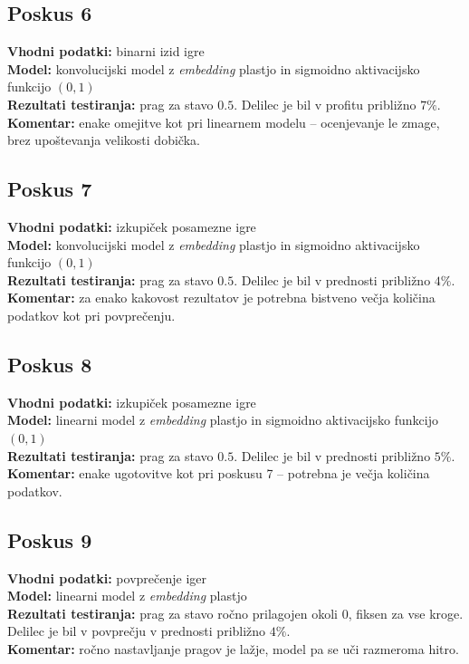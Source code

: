 \documentclass[a4paper,12pt]{article}
\begin{document}
\subsection{Poskus 6}
\textbf{Vhodni podatki:} binarni izid igre \\
\textbf{Model:} konvolucijski model z \textit{embedding} plastjo in sigmoidno aktivacijsko funkcijo $(0,1)$ \\
\textbf{Rezultati testiranja:} prag za stavo $0.5$. Delilec je bil v profitu približno $7\%$. \\
\textbf{Komentar:} enake omejitve kot pri linearnem modelu – ocenjevanje le zmage, brez upoštevanja velikosti dobička.

\subsection{Poskus 7}
\textbf{Vhodni podatki:} izkupiček posamezne igre \\
\textbf{Model:} konvolucijski model z \textit{embedding} plastjo in sigmoidno aktivacijsko funkcijo $(0,1)$ \\
\textbf{Rezultati testiranja:} prag za stavo $0.5$. Delilec je bil v prednosti približno $4\%$. \\
\textbf{Komentar:} za enako kakovost rezultatov je potrebna bistveno večja količina podatkov kot pri povprečenju.

\subsection{Poskus 8}
\textbf{Vhodni podatki:} izkupiček posamezne igre \\
\textbf{Model:} linearni model z \textit{embedding} plastjo in sigmoidno aktivacijsko funkcijo $(0,1)$ \\
\textbf{Rezultati testiranja:} prag za stavo $0.5$. Delilec je bil v prednosti približno $5\%$. \\
\textbf{Komentar:} enake ugotovitve kot pri poskusu 7 – potrebna je večja količina podatkov.

\subsection{Poskus 9}
\textbf{Vhodni podatki:} povprečenje iger \\
\textbf{Model:} linearni model z \textit{embedding} plastjo \\
\textbf{Rezultati testiranja:} prag za stavo ročno prilagojen okoli $0$, fiksen za vse kroge. Delilec je bil v povprečju v prednosti približno $4\%$. \\
\textbf{Komentar:} ročno nastavljanje pragov je lažje, model pa se uči razmeroma hitro.
\end{document}
